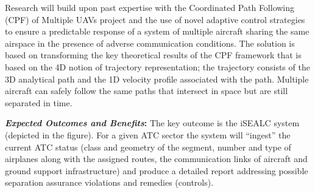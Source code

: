 \documentclass[letter,onecolumn,12pt]{aiaa-tc}
\newcommand{\1}{1_n}
\begin{document}
\vspace{-2mm}

Research will build upon past expertise with the Coordinated Path Following (CPF) of Multiple UAVs project and the use of novel adaptive control strategies to ensure a predictable response of a system of multiple aircraft sharing the same airspace in the presence of adverse communication conditions.
The solution is based on transforming the key theoretical results of the CPF framework that is based on the 4D notion of trajectory representation; the trajectory consists of the 3D analytical path and the 1D velocity profile associated with the path. Multiple aircraft can safely follow the same paths that intersect in space but are still separated in time.


\medskip

\textbf{\emph{Expected Outcomes and Benefits}:} The key outcome is the iSEALC system (depicted in the figure). For a given ATC sector the system will ``ingest'' the current ATC status (class and geometry of the segment, number and type of airplanes along with the assigned routes,  the communication links of aircraft and ground support infrastructure) and produce a detailed report addressing possible separation assurance violations and remedies (controls).
\end{document}
